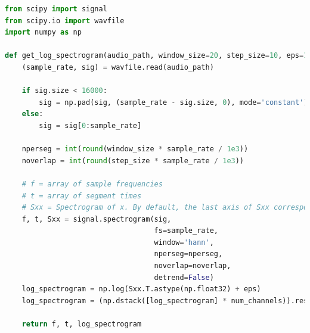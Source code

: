 \documentclass{article}
\theoremstyle{definition}
\theoremstyle{remark}
\begin{document}
\begin{lstlisting}[language=Python, caption=Get log spectrogram code, label=code:log_spectrograms]
from scipy import signal
from scipy.io import wavfile
import numpy as np

def get_log_spectrogram(audio_path, window_size=20, step_size=10, eps=1e-10, num_channels=1):
    (sample_rate, sig) = wavfile.read(audio_path)

    if sig.size < 16000:
        sig = np.pad(sig, (sample_rate - sig.size, 0), mode='constant')
    else:
        sig = sig[0:sample_rate]

    nperseg = int(round(window_size * sample_rate / 1e3))
    noverlap = int(round(step_size * sample_rate / 1e3))

    # f = array of sample frequencies
    # t = array of segment times
    # Sxx = Spectrogram of x. By default, the last axis of Sxx corresponds to the segment times.
    f, t, Sxx = signal.spectrogram(sig,
                                   fs=sample_rate,
                                   window='hann',
                                   nperseg=nperseg,
                                   noverlap=noverlap,
                                   detrend=False)
    log_spectrogram = np.log(Sxx.T.astype(np.float32) + eps)
    log_spectrogram = (np.dstack([log_spectrogram] * num_channels)).reshape(99, 161, -1)  

    return f, t, log_spectrogram
\end{lstlisting}
\end{document}
